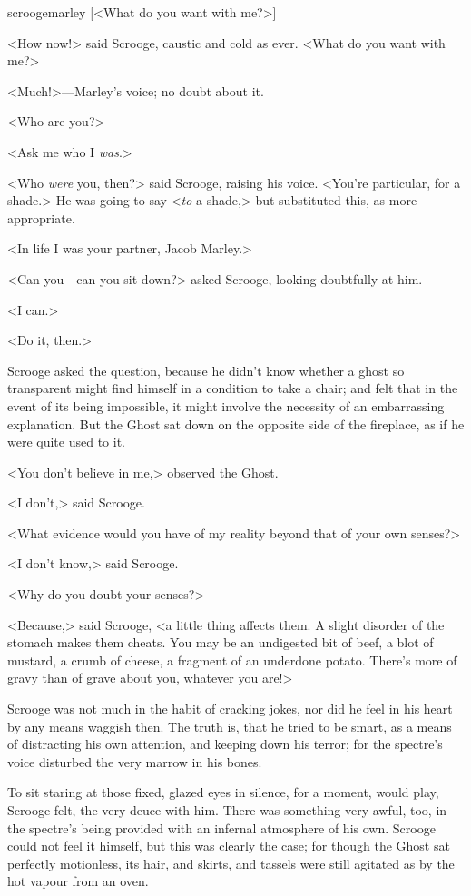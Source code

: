   \begin{colorbigpic}
    [\basicscale] 
    {scroogemarley}
    [<What do you want with me?>]
  \end{colorbigpic}

<How now!> said Scrooge, caustic and cold as ever. <What do you want with me?>

<Much!>—Marley's voice; no doubt about it.

<Who are you?>

<Ask me who I \emph{was}.>

<Who \emph{were} you, then?> said Scrooge, raising his voice. <You're
particular, for a shade.> He was going to say <\emph{to} a shade,> but
substituted this, as more appropriate.

<In life I was your partner, Jacob Marley.>

<Can you—can you sit down?> asked Scrooge, looking doubtfully at him.

<I can.>

<Do it, then.>

Scrooge asked the question, because he didn't know whether a ghost so
transparent might find himself in a condition to take a chair; and felt that in
the event of its being impossible, it might involve the necessity of an
embarrassing explanation. But the Ghost sat down on the opposite side of the
fireplace, as if he were quite used to it.

<You don't believe in me,> observed the Ghost.

<I don't,> said Scrooge.

<What evidence would you have of my reality beyond that of your own senses?>

<I don't know,> said Scrooge.

<Why do you doubt your senses?>

<Because,> said Scrooge, <a little thing affects them. A slight disorder of the
stomach makes them cheats. You may be an undigested bit of beef, a blot of
mustard, a crumb of cheese, a fragment of an underdone potato. There's more of
gravy than of grave about you, whatever you are!>

Scrooge was not much in the habit of cracking jokes, nor did he feel in his
heart by any means waggish then. The truth is, that he tried to be smart, as a
means of distracting his own attention, and keeping down his terror; for the
spectre's voice disturbed the very marrow in his bones.

To sit staring at those fixed, glazed eyes in silence, for a moment, would play,
Scrooge felt, the very deuce with him. There was something very awful, too, in
the spectre's being provided with an infernal atmosphere of his own. Scrooge
could not feel it himself, but this was clearly the case; for though the Ghost
sat perfectly motionless, its hair, and skirts, and tassels were still agitated
as by the hot vapour from an oven.

